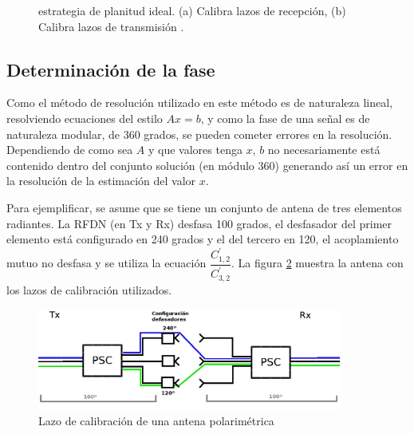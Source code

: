 \begin{figure}[H]
 \centering
	\caption{estrategia de planitud ideal. (a) Calibra lazos de recepción, (b) Calibra lazos de transmisión \cite{Aumann1989}.}
 \label{fig:ideal_strategy}
\end{figure}

\subsection{Determinación de la fase} \label{ssc:mutualPhase}

Como el método de resolución utilizado en este método es de naturaleza lineal, resolviendo ecuaciones del estilo $Ax = b$, y
como la fase de una señal es de naturaleza modular, de 360 grados, se pueden cometer errores en la resolución. Dependiendo de
como sea $A$ y que valores tenga $x$, $b$ no necesariamente está contenido dentro del conjunto solución (en módulo 360)
generando así un error en la resolución de la estimación del valor $x$.

Para ejemplificar, se asume que se tiene un conjunto de antena de tres elementos radiantes. La RFDN (en Tx y Rx) desfasa 100
grados, el desfasador del primer elemento está configurado en 240 grados y el del tercero en 120, el acoplamiento mutuo no desfasa
y se utiliza la ecuación $\dfrac{C^{'}_{1,2}}{C^{'}_{3, 2}}$. La figura \ref{fig:phaseDetermination} muestra la antena con los 
lazos de calibración utilizados.

\begin{figure}[H]
 \centering
 \includegraphics[width=10cm]{gfx/loopCal.png}
 \caption{Lazo de calibración de una antena polarimétrica}
 \label{fig:phaseDetermination}
\end{figure}

